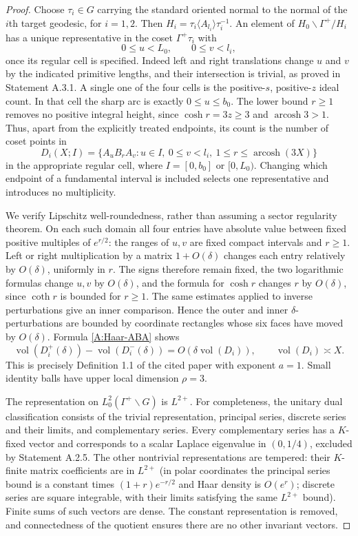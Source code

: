 \begin{proof}
Choose $\tau_i\in G$ carrying the standard oriented normal to the
normal of the $i$th target geodesic, for $i=1,2$. Then
$H_i=\tau_i\langle A_{l_i}\rangle\tau_i^{-1}$. An element of
$H_0\backslash\Gamma^+/H_i$ has a unique representative in the coset
$\Gamma^+\tau_i$ with
\[
 0\leq u<L_0,\qquad 0\leq v<l_i,
\]
once its regular cell is specified. Indeed left and right translations
change $u$ and $v$ by the indicated primitive lengths, and their
intersection is trivial, as proved in Statement A.3.1. A single one of
the four cells is the positive-$s$, positive-$z$ ideal count. In that
cell the sharp arc is exactly $0\leq u\leq b_0$.
The lower bound $r\geq1$ removes no positive integral height, since
$\cosh r=3z\geq3$ and $\operatorname{arcosh}3>1$.
Thus, apart from the explicitly treated endpoints, its count is the
number of coset points in
\[
 D_i(X;I)=\{A_u B_r A_v:u\in I,\ 0\leq v<l_i,
              \ 1\leq r\leq\operatorname{arcosh}(3X)\}
\]
in the appropriate regular cell, where $I=[0,b_0]$ or $[0,L_0)$.
Changing which endpoint of a fundamental interval is included selects
one representative and introduces no multiplicity.

We verify Lipschitz well-roundedness, rather than assuming a sector
regularity theorem. On each such domain all four entries have absolute
value between fixed positive multiples of $e^{r/2}$: the ranges of
$u,v$ are fixed compact intervals and $r\geq1$. Left or right
multiplication by a matrix $1+O(\delta)$ changes each entry relatively
by $O(\delta)$, uniformly in $r$. The signs therefore remain fixed, the
two logarithmic formulas change $u,v$ by $O(\delta)$, and the formula
for $\cosh r$ changes $r$ by $O(\delta)$, since $\coth r$ is bounded
for $r\geq1$. The same estimates applied to inverse perturbations give
an inner comparison. Hence the outer and inner $\delta$-perturbations
are bounded by coordinate rectangles whose six faces have moved by
$O(\delta)$. Formula \eqref{A:Haar-ABA} shows
\[
 \operatorname{vol}(D_i^+(\delta))-
 \operatorname{vol}(D_i^-(\delta))
       =O(\delta\operatorname{vol}(D_i)),\qquad
 \operatorname{vol}(D_i)\asymp X.
\]
This is precisely Definition 1.1 of the cited paper with exponent
$a=1$. Small identity balls have upper local dimension $\rho=3$.

The representation on $L^2_0(\Gamma^+\backslash G)$ is $L^{2+}$.
For completeness, the unitary dual classification
\cite[Theorem (2.3)]{Moriyama1999} consists of the trivial representation,
principal series, discrete series and their limits, and complementary
series. Every complementary series has a $K$-fixed vector and corresponds
to a scalar Laplace eigenvalue in $(0,1/4)$, excluded by Statement A.2.5.
The other nontrivial representations are tempered: their $K$-finite
matrix coefficients are in $L^{2+}$ (in polar coordinates the principal
series bound is a constant times $(1+r)e^{-r/2}$ and Haar density is
$O(e^r)$; discrete series are square integrable, with their limits
satisfying the same $L^{2+}$ bound). Finite sums of such vectors are dense.
The constant representation is removed, and connectedness of the quotient
ensures there are no other invariant vectors.


\end{proof}

